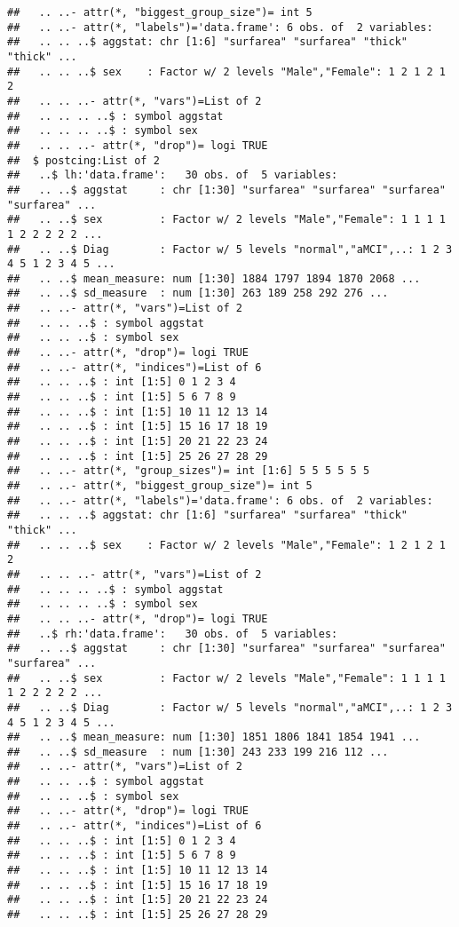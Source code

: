\documentclass[12pt]{article}\usepackage[]{graphicx}\usepackage[]{color}
\makeatletter
\newenvironment{kframe}{%
 \def\at@end@of@kframe{}%
 \ifinner\ifhmode%
  \def\at@end@of@kframe{\end{minipage}}%
  \begin{minipage}{\columnwidth}%
 \fi\fi%
 \def\FrameCommand##1{\hskip\@totalleftmargin \hskip-\fboxsep
 \colorbox{shadecolor}{##1}\hskip-\fboxsep
     \hskip-\linewidth \hskip-\@totalleftmargin \hskip\columnwidth}%
 \MakeFramed {\advance\hsize-\width
   \@totalleftmargin\z@ \linewidth\hsize
   \@setminipage}}%
 {\par\unskip\endMakeFramed%
 \at@end@of@kframe}
\newenvironment{knitrout}{}{} %
\makeatother
\begin{document}
\begin{knitrout}
\begin{kframe}
\begin{verbatim}
##   .. ..- attr(*, "biggest_group_size")= int 5
##   .. ..- attr(*, "labels")='data.frame':	6 obs. of  2 variables:
##   .. .. ..$ aggstat: chr [1:6] "surfarea" "surfarea" "thick" "thick" ...
##   .. .. ..$ sex    : Factor w/ 2 levels "Male","Female": 1 2 1 2 1 2
##   .. .. ..- attr(*, "vars")=List of 2
##   .. .. .. ..$ : symbol aggstat
##   .. .. .. ..$ : symbol sex
##   .. .. ..- attr(*, "drop")= logi TRUE
##  $ postcing:List of 2
##   ..$ lh:'data.frame':	30 obs. of  5 variables:
##   .. ..$ aggstat     : chr [1:30] "surfarea" "surfarea" "surfarea" "surfarea" ...
##   .. ..$ sex         : Factor w/ 2 levels "Male","Female": 1 1 1 1 1 2 2 2 2 2 ...
##   .. ..$ Diag        : Factor w/ 5 levels "normal","aMCI",..: 1 2 3 4 5 1 2 3 4 5 ...
##   .. ..$ mean_measure: num [1:30] 1884 1797 1894 1870 2068 ...
##   .. ..$ sd_measure  : num [1:30] 263 189 258 292 276 ...
##   .. ..- attr(*, "vars")=List of 2
##   .. .. ..$ : symbol aggstat
##   .. .. ..$ : symbol sex
##   .. ..- attr(*, "drop")= logi TRUE
##   .. ..- attr(*, "indices")=List of 6
##   .. .. ..$ : int [1:5] 0 1 2 3 4
##   .. .. ..$ : int [1:5] 5 6 7 8 9
##   .. .. ..$ : int [1:5] 10 11 12 13 14
##   .. .. ..$ : int [1:5] 15 16 17 18 19
##   .. .. ..$ : int [1:5] 20 21 22 23 24
##   .. .. ..$ : int [1:5] 25 26 27 28 29
##   .. ..- attr(*, "group_sizes")= int [1:6] 5 5 5 5 5 5
##   .. ..- attr(*, "biggest_group_size")= int 5
##   .. ..- attr(*, "labels")='data.frame':	6 obs. of  2 variables:
##   .. .. ..$ aggstat: chr [1:6] "surfarea" "surfarea" "thick" "thick" ...
##   .. .. ..$ sex    : Factor w/ 2 levels "Male","Female": 1 2 1 2 1 2
##   .. .. ..- attr(*, "vars")=List of 2
##   .. .. .. ..$ : symbol aggstat
##   .. .. .. ..$ : symbol sex
##   .. .. ..- attr(*, "drop")= logi TRUE
##   ..$ rh:'data.frame':	30 obs. of  5 variables:
##   .. ..$ aggstat     : chr [1:30] "surfarea" "surfarea" "surfarea" "surfarea" ...
##   .. ..$ sex         : Factor w/ 2 levels "Male","Female": 1 1 1 1 1 2 2 2 2 2 ...
##   .. ..$ Diag        : Factor w/ 5 levels "normal","aMCI",..: 1 2 3 4 5 1 2 3 4 5 ...
##   .. ..$ mean_measure: num [1:30] 1851 1806 1841 1854 1941 ...
##   .. ..$ sd_measure  : num [1:30] 243 233 199 216 112 ...
##   .. ..- attr(*, "vars")=List of 2
##   .. .. ..$ : symbol aggstat
##   .. .. ..$ : symbol sex
##   .. ..- attr(*, "drop")= logi TRUE
##   .. ..- attr(*, "indices")=List of 6
##   .. .. ..$ : int [1:5] 0 1 2 3 4
##   .. .. ..$ : int [1:5] 5 6 7 8 9
##   .. .. ..$ : int [1:5] 10 11 12 13 14
##   .. .. ..$ : int [1:5] 15 16 17 18 19
##   .. .. ..$ : int [1:5] 20 21 22 23 24
##   .. .. ..$ : int [1:5] 25 26 27 28 29

\end{verbatim}
\end{kframe}
\end{knitrout}
\end{document}
